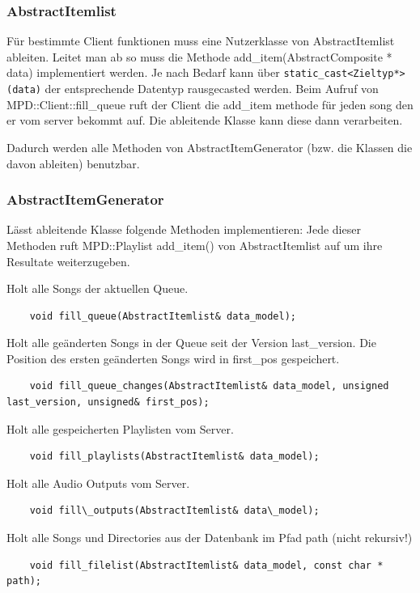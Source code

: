 \subsubsection{AbstractItemlist}
Für bestimmte Client funktionen muss eine Nutzerklasse von AbstractItemlist ableiten.
Leitet man ab so muss die Methode add\_item(AbstractComposite * data) implementiert werden. 
Je nach Bedarf kann über \verb+static_cast<Zieltyp*>(data)+ der entsprechende Datentyp rausgecasted werden.
Beim Aufruf von MPD::Client::fill\_queue ruft der Client die add\_item methode für jeden 
song den er vom server bekommt auf. Die ableitende Klasse kann diese dann verarbeiten.

Dadurch werden alle Methoden von AbstractItemGenerator (bzw. die Klassen die davon ableiten) benutzbar.

\subsubsection{AbstractItemGenerator}
Lässt ableitende Klasse folgende Methoden implementieren:
Jede dieser Methoden ruft MPD::Playlist add\_item() von AbstractItemlist auf um ihre Resultate weiterzugeben.

Holt alle Songs der aktuellen Queue.
\begin{verbatim}            
    void fill_queue(AbstractItemlist& data_model);
\end{verbatim}

Holt alle geänderten Songs in der Queue seit der Version last\_version. Die Position des ersten geänderten Songs wird in first\_pos gespeichert. 
\begin{verbatim}
    void fill_queue_changes(AbstractItemlist& data_model, unsigned last_version, unsigned& first_pos);
\end{verbatim}

Holt alle gespeicherten Playlisten vom Server.
\begin{verbatim}              
    void fill_playlists(AbstractItemlist& data_model);
\end{verbatim}

Holt alle Audio Outputs vom Server.
\begin{verbatim}
    void fill\_outputs(AbstractItemlist& data\_model);
\end{verbatim}

Holt alle Songs und Directories aus der Datenbank im Pfad path (nicht rekursiv!)              
\begin{verbatim}
    void fill_filelist(AbstractItemlist& data_model, const char * path);
\end{verbatim}

